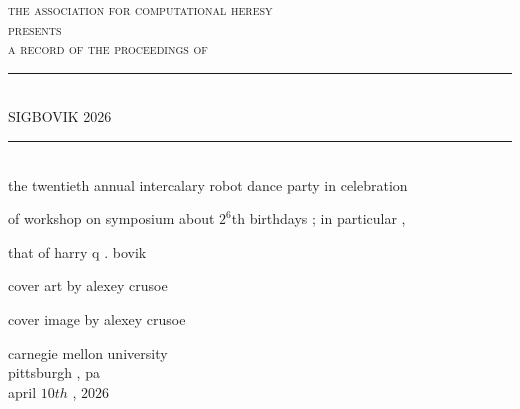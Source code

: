 \documentclass{article}
\begin{document}
\setmainfont{Splotch.ttf}
\setsansfont{Birbaslo.ttf}

\newcommand{\HRule}{\rule{\linewidth}{0.5mm}}

\begin{titlepage}
\begin{center}

\textsc{\LARGE the association for computational heresy}\\[0.5cm]

\textsc{\large presents}\\[1cm]

\textsc{\Large a record of the proceedings of}\\[0.5cm]
\HRule \\[0.4cm]
{ \Huge \sf SIGBOVIK 2026 \\[0.4cm] }
\HRule \\[2cm]


the twentieth annual intercalary robot dance party in celebration

of workshop on symposium about $2^6$th birthdays{ ;} in particular{ ,}

that of harry q{ .} bovik


\vfill

cover art by alexey crusoe

cover image by alexey crusoe


\vfill

{\Large carnegie mellon university\\[0.25cm]
pittsburgh{ ,} pa\\[0.3cm]
april $10th${ ,} $2026$}

\end{center}
\end{titlepage}
\end{document}

